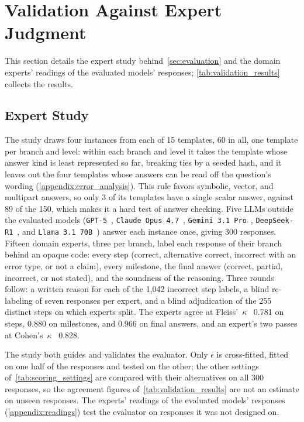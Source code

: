 \section{Validation Against Expert Judgment}
\label{appendix:validation}

This section details the expert study behind~\autoref{sec:evaluation} and the domain experts'
readings of the evaluated models' responses; \autoref{tab:validation_results} collects the results.

\subsection{Expert Study}

The study draws four instances from each of 15 templates, 60 in all, one template per branch and
level: within each branch and level it takes the template whose answer kind is least represented so
far, breaking ties by a seeded hash, and it leaves out the four templates whose answers can be read
off the question's wording (\autoref{appendix:error_analysis}).
This rule favors symbolic, vector, and multipart answers, so only 3 of its templates have a single
scalar answer, against 89 of the 150, which makes it a hard test of answer checking.
Five LLMs outside the evaluated models (\texttt{GPT-5}~\citep{gpt5},
\texttt{Claude Opus 4.7}~\citep{claudeopus47}, \texttt{Gemini 3.1 Pro}~\citep{gemini31pro},
\texttt{DeepSeek-R1}~\citep{guo2025deepseekr1}, and
\texttt{Llama 3.1 70B}~\citep{grattafiori2024llama3}) answer each instance once, giving 300
responses.
Fifteen domain experts, three per branch, label each response of their branch behind an opaque code:
every step (correct, alternative correct, incorrect with an error type, or not a claim), every
milestone, the final answer (correct, partial, incorrect, or not stated), and the soundness of the
reasoning.
Three rounds follow: a written reason for each of the 1,042 incorrect step labels, a blind
re-labeling of seven responses per expert, and a blind adjudication of the 255 distinct steps on
which experts split.
The experts agree at Fleiss'~$\kappa$~\citep{fleiss1971} 0.781 on steps, 0.880 on milestones, and
0.966 on final answers, and an expert's two passes at Cohen's~$\kappa$~\citep{cohen1960} 0.828.

The study both guides and validates the evaluator.
Only $\epsilon$ is cross-fitted, fitted on one half of the responses and tested on the other; the
other settings of~\autoref{tab:scoring_settings} are compared with their alternatives on all 300
responses, so the agreement figures of~\autoref{tab:validation_results} are not an estimate on
unseen responses.
The experts' readings of the evaluated models' responses (\autoref{appendix:readings}) test the
evaluator on responses it was not designed on.

